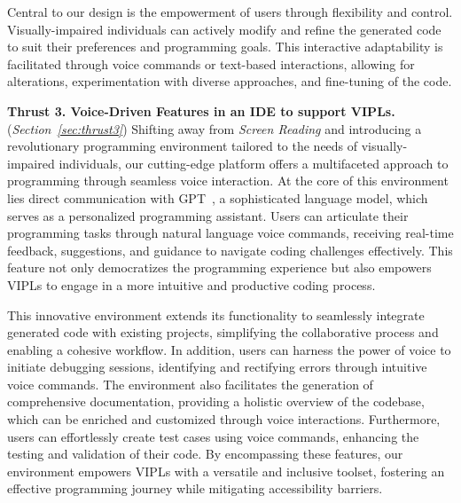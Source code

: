Central to our design is the empowerment of users through flexibility
and control. Visually-impaired individuals can actively modify and
refine the generated code to suit their preferences and programming
goals. This interactive adaptability is facilitated through voice
commands or text-based interactions, allowing for alterations,
experimentation with diverse approaches, and fine-tuning of the
code.

\vspace{3pt}
\noindent \textbf{Thrust 3. Voice-Driven Features in an IDE to support
  VIPLs.} ({\em Section~\ref{sec:thrust3}}) Shifting away from {\em
  Screen Reading} and introducing a revolutionary programming
environment tailored to the needs of visually-impaired individuals,
our cutting-edge platform offers a multifaceted approach to
programming through seamless voice interaction. At the core of this
environment lies direct communication with GPT~\cite{GPT}, a
sophisticated language model, which serves as a personalized
programming assistant. Users can articulate their programming tasks
through natural language voice commands, receiving real-time feedback,
suggestions, and guidance to navigate coding challenges
effectively. This feature not only democratizes the programming
experience but also empowers VIPLs to engage in a more intuitive and
productive coding process.

This innovative environment extends its functionality to seamlessly
integrate generated code with existing projects, simplifying the
collaborative process and enabling a cohesive workflow. In addition,
users can harness the power of voice to initiate debugging sessions,
identifying and rectifying errors through intuitive voice
commands. The environment also facilitates the generation of
comprehensive documentation, providing a holistic overview of the
codebase, which can be enriched and customized through voice
interactions. Furthermore, users can effortlessly create test cases
using voice commands, enhancing the testing and validation of their
code. By encompassing these features, our environment
empowers VIPLs with a versatile and inclusive
toolset, fostering an effective programming journey while mitigating
accessibility barriers.

